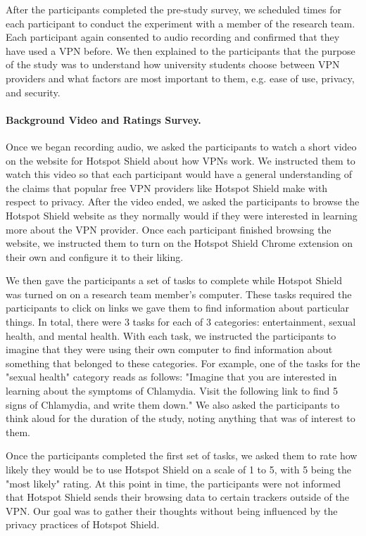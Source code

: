 After the participants completed the pre-study survey, we scheduled times for
each participant to conduct the experiment with a member of the research team.
Each participant again consented to audio recording and confirmed that they
have used a VPN before.  We then explained to the participants that the
purpose of the study was to understand how university students choose between
VPN providers and what factors are most important to them, e.g. ease of use,
privacy, and security.

\paragraph{Background Video and Ratings Survey.}
Once we began recording audio, we asked the participants to watch a short
video on the website for Hotspot Shield about how VPNs work.  We instructed
them to watch this video so that each participant would have a general
understanding of the claims that popular free VPN providers like Hotspot
Shield make with respect to privacy.  After the video ended, we asked the
participants to browse the Hotspot Shield website as they normally would
if they were interested in learning more about the VPN provider.  Once each
participant finished browsing the website, we instructed them to turn on
the Hotspot Shield Chrome extension on their own and configure it to their
liking.

We then gave the participants a set of tasks to complete while Hotspot Shield
was turned on on a research team member's computer.  These tasks required
the participants to click on links we gave them to find information about
particular things.  In total, there were 3 tasks for each of 3 categories:
entertainment, sexual health, and mental health.  With each task, we
instructed the participants to imagine that they were using their own computer
to find information about something that belonged to these categories.  For
example, one of the tasks for the "sexual health" category reads as follows:
"Imagine that you are interested in learning about the symptoms of Chlamydia.
Visit the following link to find 5 signs of Chlamydia, and write them down."
We also asked the participants to think aloud for the duration of the study,
noting anything that was of interest to them. 

Once the participants completed the first set of tasks, we asked them to rate
how likely they would be to use Hotspot Shield on a scale of 1 to 5, with 5
being the "most likely" rating.  At this point in time, the participants were not
informed that Hotspot Shield sends their browsing data to certain trackers
outside of the VPN.  Our goal was to gather their thoughts without being
influenced by the privacy practices of Hotspot Shield.

